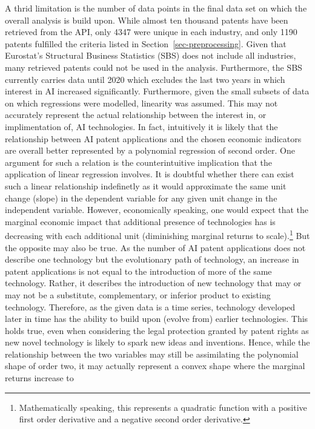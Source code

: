 \documentclass[
  11,
  a4paperpaper,
]{article}
\begin{document}
A thrid limitation is the number of data points in the final data set on
which the overall analysis is build upon. While almost ten thousand
patents have been retrieved from the API, only 4347 were unique in each
industry, and only 1190 patents fulfilled the criteria listed in
 Section~\ref{sec-preprocessing}. Given that
Eurostat's Structural Business Statistics (SBS) does not include all
industries, many retrieved patents could not be used in the analysis.
Furthermore, the SBS currently carries data until 2020 which excludes
the last two years in which interest in AI increased significantly.
Furthermore, given the small subsets of data on which regressions were
modelled, linearity was assumed. This may not accurately represent the
actual relationship between the interest in, or implimentation of, AI
technologies. In fact, intuitively it is likely that the relationship
between AI patent applications and the chosen economic indicators are
overall better represented by a polynomial regression of second order.
One argument for such a relation is the counterintuitive implication
that the application of linear regression involves. It is doubtful
whether there can exist such a linear relationship indefinetly as it
would approximate the same unit change (slope) in the dependent variable
for any given unit change in the independent variable. However,
economically speaking, one would expect that the marginal economic
impact that additional presence of technologies has is decreasing with
each additional unit (diminishing marginal returns to scale).\footnote{Mathematically
  speaking, this represents a quadratic function with a positive first
  order derivative and a negative second order derivative.} But the
opposite may also be true. As the number of AI patent applications does
not describe one technology but the evolutionary path of technology, an
increase in patent applications is not equal to the introduction of more
of the same technology. Rather, it describes the introduction of new
technology that may or may not be a substitute, complementary, or
inferior product to existing technology. Therefore, as the given data is
a time series, technology developed later in time has the ability to
build upon (evolve from) earlier technologies. This holds true, even
when considering the legal protection granted by patent rights as new
novel technology is likely to spark new ideas and inventions. Hence,
while the relationship between the two variables may still be
assimilating the polynomial shape of order two, it may actually
represent a convex shape where the marginal returns increase to
\end{document}
